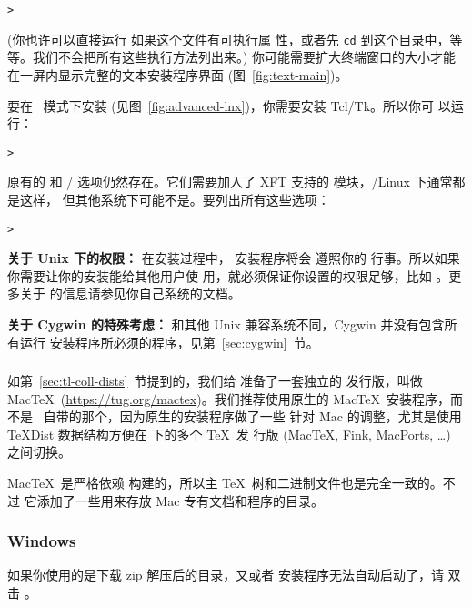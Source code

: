\documentclass{article}
\begin{document}
\begin{alltt}
> 
\end{alltt}
(你也许可以直接运行  如果这个文件有可执行属
性，或者先 \texttt{cd} 到这个目录中，等等。我们不会把所有这些执行方法列出来。)
你可能需要扩大终端窗口的大小才能在一屏内显示完整的文本安装程序界面
(图~\ref{fig:text-main})。

要在 \GUI\ 模式下安装 (见图~\ref{fig:advanced-lnx})，你需要安装 Tcl/Tk。所以你可
以运行：
\begin{alltt}
> 
\end{alltt}

原有的  和 / 选项仍然存在。它们需要加入了
XFT 支持的  模块，\GNU/Linux 下通常都是这样，
但其他系统下可能不是。要列出所有这些选项：
\begin{alltt}
> 
\end{alltt}

\textbf{关于 Unix 下的权限：} 在安装过程中，\TL{} 安装程序将会
遵照你的  行事。所以如果你需要让你的安装能给其他用户使
用，就必须保证你设置的权限足够，比如 。更多关于
 的信息请参见你自己系统的文档。

\textbf{关于 Cygwin 的特殊考虑：} 和其他 Unix 兼容系统不同，Cygwin
并没有包含所有运行 \TL{} 安装程序所必须的程序，见第~\ref{sec:cygwin}~节。

\subsubsection{\MacOSX}
\label{sec:macosx}

如第~\ref{sec:tl-coll-dists}~节提到的，我们给 \MacOSX 准备了一套独立的
发行版，叫做 Mac\TeX\ (\url{https://tug.org/mactex})。我们推荐使用原生的
Mac\TeX\ 安装程序，而不是 \TL\ 自带的那个，因为原生的安装程序做了一些
针对 Mac 的调整，尤其是使用 \TeX{}Dist 数据结构方便在 \MacOSX 下的多个 \TeX\ 发
行版 (Mac\TeX, Fink, MacPorts, \ldots) 之间切换。

Mac\TeX\ 是严格依赖 \TL 构建的，所以主 \TeX\ 树和二进制文件也是完全一致的。不过
它添加了一些用来存放 Mac 专有文档和程序的目录。

\subsubsection{Windows}\label{sec:wininst}

如果你使用的是下载 zip 解压后的目录，又或者 \DVD 安装程序无法自动启动了，请
双击 。
\end{document}

